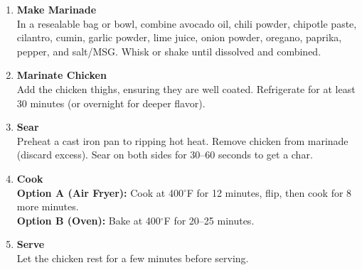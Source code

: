 \begin{enumerate}

      \item \textbf{Make Marinade} \\
            In a resealable bag or bowl, combine avocado oil, chili powder, chipotle paste, cilantro, cumin, garlic powder, lime juice, onion powder, oregano, paprika, pepper, and salt/MSG. Whisk or shake until dissolved and combined.

      \item \textbf{Marinate Chicken} \\
            Add the chicken thighs, ensuring they are well coated. Refrigerate for at least 30 minutes (or overnight for deeper flavor).

      \item \textbf{Sear} \\
            Preheat a cast iron pan to ripping hot heat. Remove chicken from marinade (discard excess). Sear on both sides for 30–60 seconds to get a char.

      \item \textbf{Cook} \\
            \textbf{Option A (Air Fryer):} Cook at 400$^\circ$F for 12 minutes, flip, then cook for 8 more minutes. \\
            \textbf{Option B (Oven):} Bake at 400$^\circ$F for 20–25 minutes.

      \item \textbf{Serve} \\
            Let the chicken rest for a few minutes before serving.

\end{enumerate}


